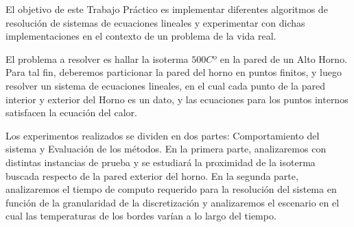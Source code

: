 El objetivo de este Trabajo Práctico es implementar diferentes algoritmos de resolución de sistemas de ecuaciones lineales y experimentar con dichas implementaciones en el contexto de un problema de la vida real.

El problema a resolver es hallar la isoterma $500Cº$ en la pared de un Alto Horno. Para tal fin, deberemos particionar la pared del horno en puntos finitos, y luego resolver un sistema de ecuaciones lineales, en el cual cada punto de la pared interior y exterior del Horno es un dato, y las ecuaciones para los puntos internos satisfacen la ecuación del calor.

Los experimentos realizados se dividen en dos partes: Comportamiento del sistema y Evaluación de los métodos. En la primera parte, analizaremos con distintas instancias de prueba y se estudiará la proximidad de la isoterma buscada respecto de la pared exterior del horno. En la segunda parte, analizaremos el tiempo de computo requerido para la resolución del sistema en función de la granularidad de la discretización y analizaremos el escenario en el cual las temperaturas de los bordes varían a lo largo del tiempo.
